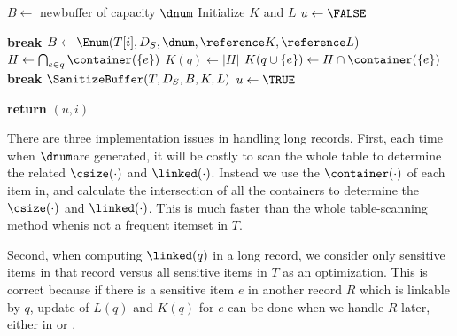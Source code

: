 \begin{algorithm}[th]
\caption{$\HandleLongRecord(\reference T, D_S, i, \dnum)$}
\label{algo:handlelong}
\begin{algorithmic}[1]
    \STATE $B\leftarrow$ new\qid buffer of capacity $\dnum$
    \STATE Initialize $K$ and $L$
    \STATE $u\leftarrow\FALSE$
    
    \LOOP
        {
            \textbf{break}
        \ENDIF}
        \STATE $B\leftarrow\Enum(T[i], D_S, \dnum, \reference K, \reference L)$
            \STATE $H\leftarrow\bigcap_{e\in q}\container(\{e\})$
            \STATE $K(q)\leftarrow|H|$
              \STATE $K(q\cup\{e\})\leftarrow H\cap\container(\{e\})$
            \ENDFOR
        \ENDFOR
        {
            \textbf{break}
        \ENDIF}
         \label{line:handle-long-if-contains-unsafe}
            \STATE $\SanitizeBuffer(T, D_S, B, K, L)$
            \STATE $u\leftarrow\TRUE$
        \ENDIF
    \ENDLOOP
    
    \STATE \textbf{return} $(u,i)$ \label{line:handle-long-return}
\end{algorithmic}
\end{algorithm}

There are three implementation issues in handling long records.
First, each time when $\dnum$\qids are generated,
it will be costly to scan the whole table to determine the related
$\csize(\cdot)$ and $\linked(\cdot)$.
Instead we use the $\container(\cdot)$ of each item in\qidx,
and calculate the intersection of all the containers to determine
the $\csize(\cdot)$ and $\linked(\cdot)$.
This is much faster than the whole table-scanning method when\qid is not a frequent itemset in $T$.

Second, when computing $\linked(q)$ in a long record,
we consider only sensitive items in that record versus all sensitive items in $T$ as an optimization. 
This is correct because if there is a sensitive item $e$ in another record $R$
which is linkable by $q$, update of $L(q)$ and $K(q)$ for $e$ can be done
when we handle $R$ later, either in \HandleShortRecords or \HandleLongRecord.

